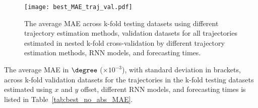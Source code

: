 \begin{figure}[!ht]
	\centering
	\texttt{[image: best\_MAE\_traj\_val.pdf]}
	\caption{The average MAE across k-fold testing datasets using different trajectory estimation methods, validation datasets for all trajectories estimated in nested k-fold cross-validation by different trajectory estimation methods, RNN models, and forecasting times.}
	\label{fig:best_MAE_traj_val}
\end{figure}

The average MAE in $\degree$ ($\times 10^{-3}$), with standard deviation in brackets, across k-fold validation datasets for the trajectories in the k-fold testing datasets estimated using $x$ and $y$ offset, different RNN models, and forecasting times is listed in Table~\ref{tab:best_no_abs_MAE}.

\begin{table}[!ht]
	\centering
	\caption{The average MAE in $\degree$ ($\times 10^{-3}$), with standard deviation in brackets, across k-fold validation datasets for the trajectories in the k-fold testing datasets estimated using $x$ and $y$ offset, different RNN models, and forecasting times.}
	\label{tab:best_no_abs_MAE}
\end{table}

